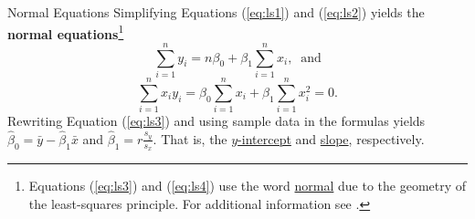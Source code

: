 \documentclass[pdf]{beamer}
\newcommand{\empr}[1]{{\color{franklinblue}\textbf{#1}}}
\theoremstyle{remark}
\theoremstyle{definition}
\begin{document}
\begin{frame}[t]{Normal Equations}
Simplifying Equations (\ref{eq:ls1}) and (\ref{eq:ls2}) yields the \empr{normal equations}\footnote{Equations (\ref{eq:ls3}) and (\ref{eq:ls4}) use the word \underline{normal} due to the geometry of the least-squares principle. For additional information see \cite{johnston1997}.}
\vspace{0.0ex}
\begin{equation} \label{eq:ls3}
\sum_{i=1}^n y_i = n \beta_0 + \beta_1 \sum_{i=1}^n x_i, \;\; \text{and}
\end{equation}
\begin{equation} \label{eq:ls4}
\sum_{i=1}^n x_i y_i =\beta_0 \sum_{i=1}^n x_i + \beta_1\sum_{i=1}^n x_i^2 = 0.
\end{equation}
Rewriting Equation (\ref{eq:ls3}) and using sample data in the formulas yields $\hat{\beta}_0 = \bar{y} - \hat{\beta}_1\bar{x}$ and $\hat{\beta}_1 = r \frac{s_y}{s_x}$.  That is, the \underline{$y$-intercept} and \underline{slope}, respectively.
\end{frame}
\end{document}
